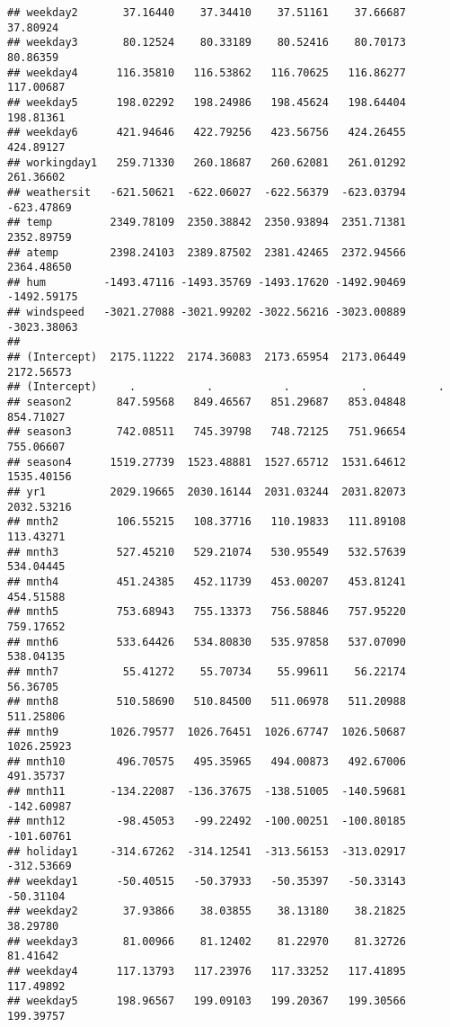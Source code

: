 \documentclass[]{article}
\begin{document}
\begin{verbatim}
## weekday2       37.16440    37.34410    37.51161    37.66687    37.80924
## weekday3       80.12524    80.33189    80.52416    80.70173    80.86359
## weekday4      116.35810   116.53862   116.70625   116.86277   117.00687
## weekday5      198.02292   198.24986   198.45624   198.64404   198.81361
## weekday6      421.94646   422.79256   423.56756   424.26455   424.89127
## workingday1   259.71330   260.18687   260.62081   261.01292   261.36602
## weathersit   -621.50621  -622.06027  -622.56379  -623.03794  -623.47869
## temp         2349.78109  2350.38842  2350.93894  2351.71381  2352.89759
## atemp        2398.24103  2389.87502  2381.42465  2372.94566  2364.48650
## hum         -1493.47116 -1493.35769 -1493.17620 -1492.90469 -1492.59175
## windspeed   -3021.27088 -3021.99202 -3022.56216 -3023.00889 -3023.38063
##                                                                        
## (Intercept)  2175.11222  2174.36083  2173.65954  2173.06449  2172.56573
## (Intercept)     .           .           .           .           .      
## season2       847.59568   849.46567   851.29687   853.04848   854.71027
## season3       742.08511   745.39798   748.72125   751.96654   755.06607
## season4      1519.27739  1523.48881  1527.65712  1531.64612  1535.40156
## yr1          2029.19665  2030.16144  2031.03244  2031.82073  2032.53216
## mnth2         106.55215   108.37716   110.19833   111.89108   113.43271
## mnth3         527.45210   529.21074   530.95549   532.57639   534.04445
## mnth4         451.24385   452.11739   453.00207   453.81241   454.51588
## mnth5         753.68943   755.13373   756.58846   757.95220   759.17652
## mnth6         533.64426   534.80830   535.97858   537.07090   538.04135
## mnth7          55.41272    55.70734    55.99611    56.22174    56.36705
## mnth8         510.58690   510.84500   511.06978   511.20988   511.25806
## mnth9        1026.79577  1026.76451  1026.67747  1026.50687  1026.25923
## mnth10        496.70575   495.35965   494.00873   492.67006   491.35737
## mnth11       -134.22087  -136.37675  -138.51005  -140.59681  -142.60987
## mnth12        -98.45053   -99.22492  -100.00251  -100.80185  -101.60761
## holiday1     -314.67262  -314.12541  -313.56153  -313.02917  -312.53669
## weekday1      -50.40515   -50.37933   -50.35397   -50.33143   -50.31104
## weekday2       37.93866    38.03855    38.13180    38.21825    38.29780
## weekday3       81.00966    81.12402    81.22970    81.32726    81.41642
## weekday4      117.13793   117.23976   117.33252   117.41895   117.49892
## weekday5      198.96567   199.09103   199.20367   199.30566   199.39757

\end{verbatim}
\end{document}
